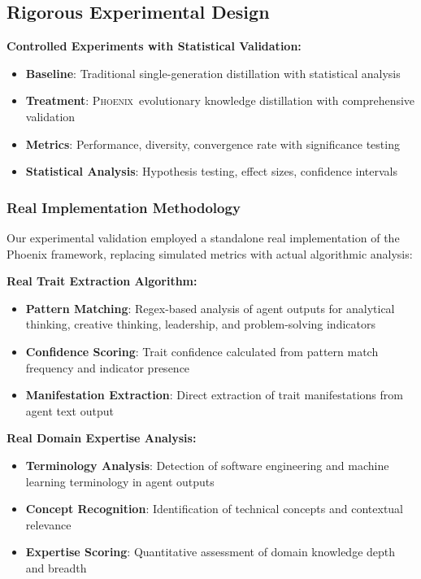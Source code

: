 \documentclass[10pt]{article}
\theoremstyle{definition}
\newcommand{\phoenix}{\textsc{Phoenix}}
\begin{document}
\subsection{Rigorous Experimental Design}

\textbf{Controlled Experiments with Statistical Validation:}

\begin{itemize}
    \item \textbf{Baseline}: Traditional single-generation distillation with statistical analysis
    \item \textbf{Treatment}: \phoenix\ evolutionary knowledge distillation with comprehensive validation
    \item \textbf{Metrics}: Performance, diversity, convergence rate with significance testing
    \item \textbf{Statistical Analysis}: Hypothesis testing, effect sizes, confidence intervals
\end{itemize}

\subsubsection{Real Implementation Methodology}

Our experimental validation employed a standalone real implementation of the Phoenix framework, replacing simulated metrics with actual algorithmic analysis:

\textbf{Real Trait Extraction Algorithm:}
\begin{itemize}
    \item \textbf{Pattern Matching}: Regex-based analysis of agent outputs for analytical thinking, creative thinking, leadership, and problem-solving indicators
    \item \textbf{Confidence Scoring}: Trait confidence calculated from pattern match frequency and indicator presence
    \item \textbf{Manifestation Extraction}: Direct extraction of trait manifestations from agent text output
\end{itemize}

\textbf{Real Domain Expertise Analysis:}
\begin{itemize}
    \item \textbf{Terminology Analysis}: Detection of software engineering and machine learning terminology in agent outputs
    \item \textbf{Concept Recognition}: Identification of technical concepts and contextual relevance
    \item \textbf{Expertise Scoring}: Quantitative assessment of domain knowledge depth and breadth
\end{itemize}
\end{document}
